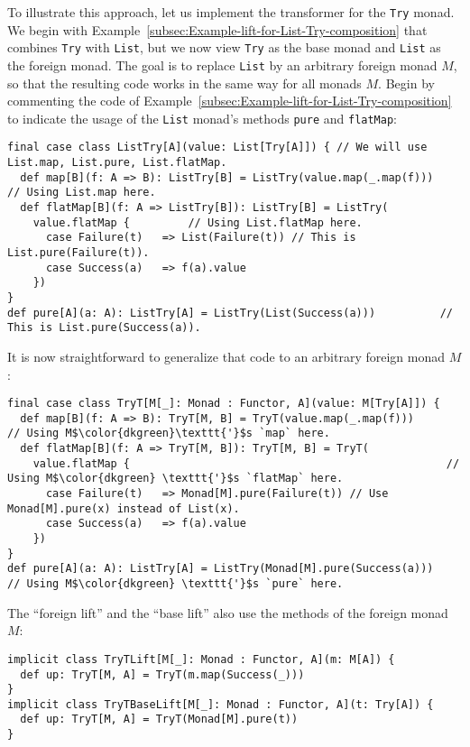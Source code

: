 To illustrate this approach, let us implement the transformer for
the \lstinline!Try! monad. We begin with Example~\ref{subsec:Example-lift-for-List-Try-composition}
that combines \lstinline!Try! with \lstinline!List!, but we now
view \lstinline!Try! as the base monad and \lstinline!List! as the
foreign monad. The goal is to replace \lstinline!List! by an arbitrary
foreign monad $M$, so that the resulting code works in the same way
for all monads $M$. Begin by commenting the code of Example~\ref{subsec:Example-lift-for-List-Try-composition}
to indicate the usage of the \lstinline!List! monad\textsf{'}s methods \lstinline!pure!
and \lstinline!flatMap!:
\begin{lstlisting}
final case class ListTry[A](value: List[Try[A]]) { // We will use List.map, List.pure, List.flatMap.
  def map[B](f: A => B): ListTry[B] = ListTry(value.map(_.map(f)))           // Using List.map here.
  def flatMap[B](f: A => ListTry[B]): ListTry[B] = ListTry(
    value.flatMap {         // Using List.flatMap here.
      case Failure(t)   => List(Failure(t)) // This is List.pure(Failure(t)).
      case Success(a)   => f(a).value
    })
}
def pure[A](a: A): ListTry[A] = ListTry(List(Success(a)))          // This is List.pure(Success(a)).
\end{lstlisting}
It is now straightforward to generalize that code to an arbitrary
foreign monad $M$:
\begin{lstlisting}[mathescape=true]
final case class TryT[M[_]: Monad : Functor, A](value: M[Try[A]]) {
  def map[B](f: A => B): TryT[M, B] = TryT(value.map(_.map(f)))         // Using M$\color{dkgreen}\texttt{'}$s `map` here.
  def flatMap[B](f: A => TryT[M, B]): TryT[M, B] = TryT(
    value.flatMap {                                                 // Using M$\color{dkgreen} \texttt{'}$s `flatMap` here.
      case Failure(t)   => Monad[M].pure(Failure(t)) // Use Monad[M].pure(x) instead of List(x).
      case Success(a)   => f(a).value
    })
}
def pure[A](a: A): ListTry[A] = ListTry(Monad[M].pure(Success(a)))     // Using M$\color{dkgreen} \texttt{'}$s `pure` here.
\end{lstlisting}
The \textsf{``}foreign lift\textsf{''} and the \textsf{``}base lift\textsf{''} also use the methods
of the foreign monad $M$:
\begin{lstlisting}
implicit class TryTLift[M[_]: Monad : Functor, A](m: M[A]) {
  def up: TryT[M, A] = TryT(m.map(Success(_)))
}
implicit class TryTBaseLift[M[_]: Monad : Functor, A](t: Try[A]) {
  def up: TryT[M, A] = TryT(Monad[M].pure(t))
}
\end{lstlisting}
